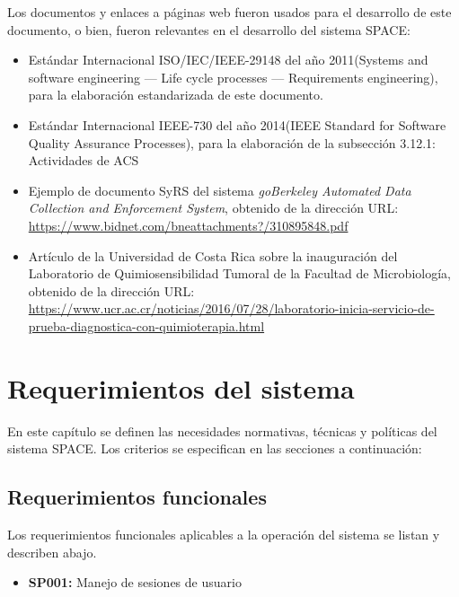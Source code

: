 \documentclass{scrreprt}
\begin{document}
Los documentos y enlaces a páginas web fueron usados para el desarrollo de este documento, o bien, fueron relevantes en el desarrollo del sistema SPACE:
\begin{itemize}
\item Estándar Internacional ISO/IEC/IEEE-29148 del año 2011(Systems and software engineering — Life cycle processes — Requirements engineering), para la elaboración estandarizada de este documento.
\item Estándar Internacional IEEE-730 del año 2014(IEEE Standard for Software Quality Assurance Processes), para la elaboración de la subsección 3.12.1: Actividades de ACS
\item Ejemplo de documento SyRS del sistema \textit{goBerkeley Automated Data Collection and Enforcement System}, obtenido de la dirección URL:\\
\href{https://www.bidnet.com/bneattachments?/310895848.pdf}{https://www.bidnet.com/bneattachments?/310895848.pdf}
\item Artículo de la Universidad de Costa Rica sobre la inauguración del Laboratorio de Quimiosensibilidad Tumoral de la Facultad de Microbiología, obtenido de la dirección URL:\\
\href{https://www.ucr.ac.cr/noticias/2016/07/28/laboratorio-inicia-servicio-de-prueba-diagnostica-con-quimioterapia.html}{https://www.ucr.ac.cr/noticias/2016/07/28/laboratorio-inicia-servicio-de-prueba-diagnostica-con-quimioterapia.html}
\end{itemize}

\chapter{Requerimientos del sistema}

En este capítulo se definen las necesidades normativas, técnicas y políticas del sistema SPACE. Los criterios se especifican en las secciones a continuación:

\section{Requerimientos funcionales}

Los requerimientos funcionales aplicables a la operación del sistema se listan y describen abajo.

\begin{itemize}
\item \textbf{SP001:} Manejo de sesiones de usuario
\end{itemize}
\end{document}
